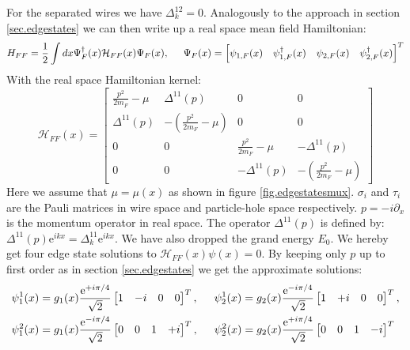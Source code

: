 For the separated wires we have $\Delta^{12}_k = 0$. Analogously to the approach in section \ref{sec.edgestates} we can then write up a real space mean field Hamiltonian:
\begin{equation}
H_{FF} = \frac{1}{2}\int dx \Psi^\dagger_{F}(x) \mathcal{H}_{FF}(x) \Psi_{F}(x), \hspace{0.5cm} \Psi_{F}(x) = \begin{bmatrix} \psi_{1,F}(x) & \psi^\dagger_{1,F}(x) & \psi_{2,F}(x) & \psi^\dagger_{2,F}(x)\end{bmatrix}^T
\label{eq.2wiresMFHamiltonianrealspace}
\end{equation}
With the real space Hamiltonian kernel:
\begin{equation}
\mathcal{H}_{FF}(x) = \begin{bmatrix} 
\frac{p^2}{2m_F} - \mu & \Delta^{11}(p) & 0 & 0 \\
\Delta^{11}(p) & -\left(\frac{p^2}{2m_F} - \mu \right) & 0 & 0 \\
0 & 0 & \frac{p^2}{2m_F} - \mu & -\Delta^{11}(p) \\
0 & 0 & -\Delta^{11}(p) & -\left(\frac{p^2}{2m_F} - \mu \right)
\end{bmatrix}
\label{eq.2wiresMFHamiltonianrealspacefirstquantization}
\end{equation}
Here we assume that $\mu = \mu(x)$ as shown in figure \ref{fig.edgestatesmux}. $\sigma_i$ and $\tau_i$ are the Pauli matrices in wire space and particle-hole space respectively. $p = -i\partial_x$ is the momentum operator in real space. The operator $\Delta^{11}(p)$ is defined by: $\Delta^{11}(p)\text{e}^{ikx} = \Delta^{11}_k\text{e}^{ikx}$. We have also dropped the grand energy $E_0$. We hereby get four edge state solutions to $\mathcal{H}_{FF}(x)\psi(x) = 0$. By keeping only $p$ up to first order as in section \ref{sec.edgestates} we get the approximate solutions:
\begin{align}
\psi^1_1(x) &= g_1(x)\frac{\text{e}^{+i\pi/4}}{\sqrt{2}}\begin{bmatrix} 1 & -i & 0 & 0 \end{bmatrix}^T , \hspace{0.5cm} \psi^1_2(x) = g_2(x)\frac{\text{e}^{-i\pi/4}}{\sqrt{2}}\begin{bmatrix} 1 & +i & 0 & 0 \end{bmatrix}^T, \nonumber \\
\psi^2_1(x) &= g_1(x)\frac{\text{e}^{-i\pi/4}}{\sqrt{2}}\begin{bmatrix} 0 & 0 & 1 & +i \end{bmatrix}^T , \hspace{0.5cm} \psi^2_2(x) = g_2(x)\frac{\text{e}^{+i\pi/4}}{\sqrt{2}}\begin{bmatrix} 0 & 0 & 1 & -i \end{bmatrix}^T
\end{align}
